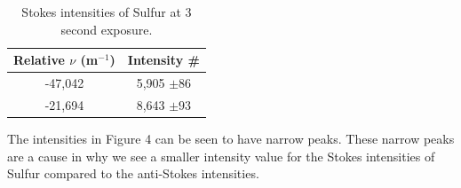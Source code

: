 \documentclass[twocolumn]{article}
\begin{document}
\begin{table}[htp]
\begin{center}
\begin{tabular}{|c|c|}
    \hline \textbf{Relative $\nu$ (m$^{-1}$)} & \textbf{Intensity \#} \\ \hline
    -47,042 & 5,905 $\pm 86$ \\ \hline
    -21,694 & 8,643 $\pm 93$ \\ \hline
\end{tabular}
\caption{Stokes intensities of Sulfur at 3 second exposure.}
\end{center}
\label{default}
\end{table}%
\newline
The intensities in Figure 4 can be seen to have narrow peaks. These narrow peaks are a cause in why we see a smaller intensity value for the Stokes intensities of Sulfur compared to the anti-Stokes intensities.
\end{document}

